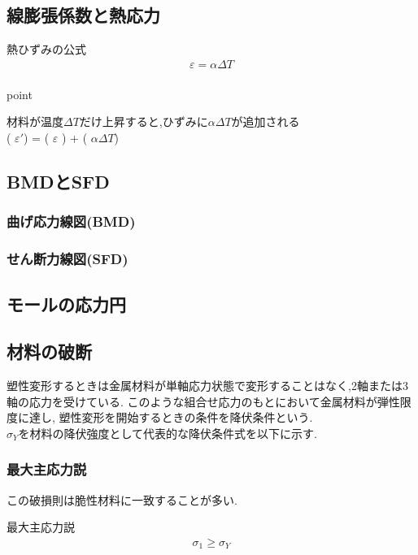 \documentclass[a4paper]{jsarticle}
\begin{document}
\subsection{線膨張係数と熱応力}
\begin{itembox}[l]{熱ひずみの公式}
    \begin{eqnarray*}
        \varepsilon=\alpha\Delta T\\
    \end{eqnarray*}
\end{itembox}
\begin{itembox}[l]{point}
    \begin{center}
        材料が温度$\Delta T$だけ上昇すると,ひずみに$\alpha \Delta T$が追加される\\
        ( $\varepsilon'$) = ( $\varepsilon$ ) + ( $\alpha \Delta T$)
    \end{center}
\end{itembox}
\subsection{BMDとSFD}
\subsubsection{曲げ応力線図(BMD)}
\subsubsection{せん断力線図(SFD)}
\subsection{モールの応力円}
\subsection{材料の破断}
塑性変形するときは金属材料が単軸応力状態で変形することはなく,2軸または3軸の応力を受けている.
このような組合せ応力のもとにおいて金属材料が弾性限度に達し,
塑性変形を開始するときの条件を降伏条件という.\\
$\sigma_Y$を材料の降伏強度として代表的な降伏条件式を以下に示す.
\subsubsection{最大主応力説}
この破損則は脆性材料に一致することが多い.
\begin{itembox}[l]{最大主応力説}
    \begin{eqnarray*}
        \sigma_1\geq\sigma_Y\\
    \end{eqnarray*}
\end{itembox}
\end{document}
